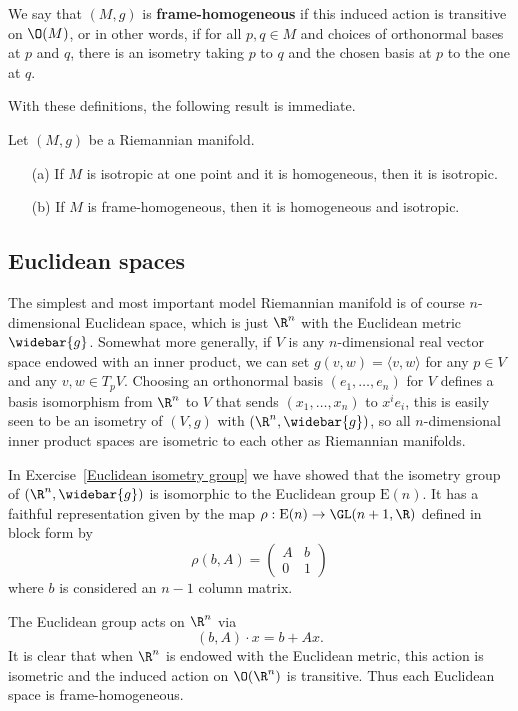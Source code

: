 We say that $(M,g)$ is \textbf{frame-homogeneous} if this induced action is transitive on $\O(M)$, or in other words, if for all $p,q\in M$ and choices of orthonormal bases at $p$ and $q$, there is an isometry taking $p$ to $q$ and the chosen basis at $p$ to the one at $q$.\par
With these definitions, the following result is immediate.
\begin{proposition}
Let $(M,g)$ be a Riemannian manifold.
\begin{itemize}
\item[(a)] If $M$ is isotropic at one point and it is homogeneous, then it is isotropic.
\item[(b)] If $M$ is frame-homogeneous, then it is homogeneous and isotropic.
\end{itemize}
\end{proposition}
\subsection{Euclidean spaces}
The simplest and most important model Riemannian manifold is of course $n$-dimensional Euclidean 
space, which is just $\R^n$ with the Euclidean metric $\widebar{g}$. Somewhat more generally, 
if $V$ is any $n$-dimensional real vector space endowed with an inner product, we can set 
$g(v,w)=\langle v,w\rangle$ for any $p\in V$ and any $v,w\in T_pV$. Choosing an orthonormal 
basis $(e_1,\dots,e_n)$ for $V$ defines a basis isomorphism from $\R^n$ to $V$ that sends 
$(x_1,\dots,x_n)$ to $x^ie_i$, this is easily seen to be an isometry of $(V,g)$ with 
$(\R^n,\widebar{g})$, so all $n$-dimensional inner product spaces are isometric to each other 
as Riemannian manifolds.\par
In Exercise~\ref{Euclidean isometry group} we have showed that the isometry group of $(\R^n,\widebar{g})$ is isomorphic to the Euclidean group $\mathrm{E}(n)$. It has a faithful representation given by the map $\rho:\mathrm{E}(n)\to\GL(n+1,\R)$ defined in block form by
\[\rho(b,A)=\begin{pmatrix}
A&b\\
0&1
\end{pmatrix}\]
where $b$ is considered an $n-1$ column matrix.\par
The Euclidean group acts on $\R^n$ via
\[(b,A)\cdot x=b+Ax.\]
It is clear that when $\R^n$ is endowed with the Euclidean metric, this action is isometric and the induced action on $\O(\R^n)$ is transitive. Thus each Euclidean space is frame-homogeneous.
